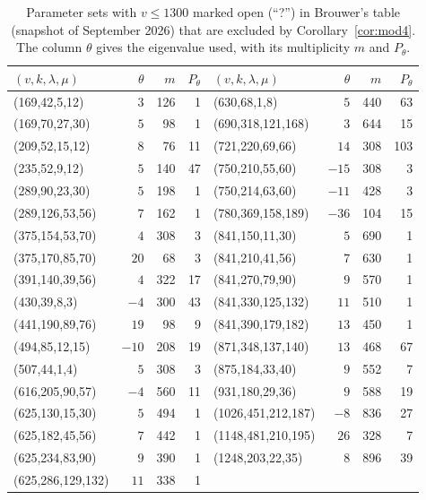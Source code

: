 \documentclass[11pt]{amsart}
\theoremstyle{remark}
\begin{document}
\begin{table}[ht]
\centering
\caption{Parameter sets with $v\le 1300$ marked open (``?'') in Brouwer's table (snapshot of September 2026) that are
excluded by Corollary~\ref{cor:mod4}. The column $\theta$ gives the eigenvalue used, with its multiplicity $m$ and $P_\theta$.}
\label{tab:open}
\begin{tabular}{lrrr@{\qquad}lrrr}
\toprule
$(v,k,\lambda,\mu)$ & $\theta$ & $m$ & $P_\theta$ & $(v,k,\lambda,\mu)$ & $\theta$ & $m$ & $P_\theta$\\
\midrule
(169,42,5,12) & $3$ & 126 & 1 & (630,68,1,8) & $5$ & 440 & 63\\
(169,70,27,30) & $5$ & 98 & 1 & (690,318,121,168) & $3$ & 644 & 15\\
(209,52,15,12) & $8$ & 76 & 11 & (721,220,69,66) & $14$ & 308 & 103\\
(235,52,9,12) & $5$ & 140 & 47 & (750,210,55,60) & $-15$ & 308 & 3\\
(289,90,23,30) & $5$ & 198 & 1 & (750,214,63,60) & $-11$ & 428 & 3\\
(289,126,53,56) & $7$ & 162 & 1 & (780,369,158,189) & $-36$ & 104 & 15\\
(375,154,53,70) & $4$ & 308 & 3 & (841,150,11,30) & $5$ & 690 & 1\\
(375,170,85,70) & $20$ & 68 & 3 & (841,210,41,56) & $7$ & 630 & 1\\
(391,140,39,56) & $4$ & 322 & 17 & (841,270,79,90) & $9$ & 570 & 1\\
(430,39,8,3) & $-4$ & 300 & 43 & (841,330,125,132) & $11$ & 510 & 1\\
(441,190,89,76) & $19$ & 98 & 9 & (841,390,179,182) & $13$ & 450 & 1\\
(494,85,12,15) & $-10$ & 208 & 19 & (871,348,137,140) & $13$ & 468 & 67\\
(507,44,1,4) & $5$ & 308 & 3 & (875,184,33,40) & $9$ & 552 & 7\\
(616,205,90,57) & $-4$ & 560 & 11 & (931,180,29,36) & $9$ & 588 & 19\\
(625,130,15,30) & $5$ & 494 & 1 & (1026,451,212,187) & $-8$ & 836 & 27\\
(625,182,45,56) & $7$ & 442 & 1 & (1148,481,210,195) & $26$ & 328 & 7\\
(625,234,83,90) & $9$ & 390 & 1 & (1248,203,22,35) & $8$ & 896 & 39\\
(625,286,129,132) & $11$ & 338 & 1 &  & & &\\
\bottomrule
\end{tabular}
\end{table}
\end{document}
